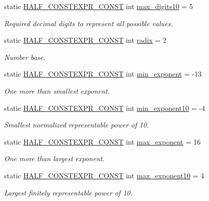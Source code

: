 \begin{DoxyCompactItemize}
static \hyperlink{half_8hpp_a5df92c245e5d4e45d35fad7b6de73354}{H\+A\+L\+F\+\_\+\+C\+O\+N\+S\+T\+E\+X\+P\+R\+\_\+\+C\+O\+N\+ST} int \hyperlink{classstd_1_1numeric__limits_3_01half__float_1_1half_01_4_a07d190feb781f88a0d6190afd1d5279a}{max\+\_\+digits10} = 5
\begin{DoxyCompactList}\small\item\em Required decimal digits to represent all possible values. \end{DoxyCompactList}\item 
static \hyperlink{half_8hpp_a5df92c245e5d4e45d35fad7b6de73354}{H\+A\+L\+F\+\_\+\+C\+O\+N\+S\+T\+E\+X\+P\+R\+\_\+\+C\+O\+N\+ST} int \hyperlink{classstd_1_1numeric__limits_3_01half__float_1_1half_01_4_af8a3c3c34ae601c519a4e5be73b81998}{radix} = 2
\begin{DoxyCompactList}\small\item\em Number base. \end{DoxyCompactList}\item 
static \hyperlink{half_8hpp_a5df92c245e5d4e45d35fad7b6de73354}{H\+A\+L\+F\+\_\+\+C\+O\+N\+S\+T\+E\+X\+P\+R\+\_\+\+C\+O\+N\+ST} int \hyperlink{classstd_1_1numeric__limits_3_01half__float_1_1half_01_4_ae545fa9d20d845ae1bf55bb6ce6b7e1d}{min\+\_\+exponent} = -\/13
\begin{DoxyCompactList}\small\item\em One more than smallest exponent. \end{DoxyCompactList}\item 
static \hyperlink{half_8hpp_a5df92c245e5d4e45d35fad7b6de73354}{H\+A\+L\+F\+\_\+\+C\+O\+N\+S\+T\+E\+X\+P\+R\+\_\+\+C\+O\+N\+ST} int \hyperlink{classstd_1_1numeric__limits_3_01half__float_1_1half_01_4_ac8e5727691c06e4ee4fc124e7567edc3}{min\+\_\+exponent10} = -\/4
\begin{DoxyCompactList}\small\item\em Smallest normalized representable power of 10. \end{DoxyCompactList}\item 
static \hyperlink{half_8hpp_a5df92c245e5d4e45d35fad7b6de73354}{H\+A\+L\+F\+\_\+\+C\+O\+N\+S\+T\+E\+X\+P\+R\+\_\+\+C\+O\+N\+ST} int \hyperlink{classstd_1_1numeric__limits_3_01half__float_1_1half_01_4_a41f49d6fa628325afbe7870b0ce945c2}{max\+\_\+exponent} = 16
\begin{DoxyCompactList}\small\item\em One more than largest exponent. \end{DoxyCompactList}\item 
static \hyperlink{half_8hpp_a5df92c245e5d4e45d35fad7b6de73354}{H\+A\+L\+F\+\_\+\+C\+O\+N\+S\+T\+E\+X\+P\+R\+\_\+\+C\+O\+N\+ST} int \hyperlink{classstd_1_1numeric__limits_3_01half__float_1_1half_01_4_aed5c9a3c44d6e9e6949926674648d7ce}{max\+\_\+exponent10} = 4
\begin{DoxyCompactList}\small\item\em Largest finitely representable power of 10. \end{DoxyCompactList}\end{DoxyCompactItemize}


